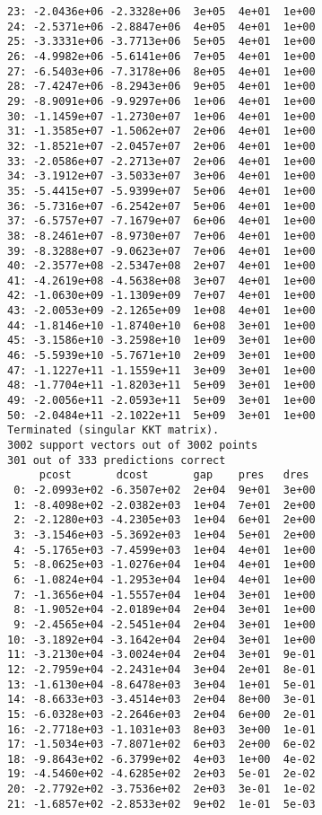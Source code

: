 \documentclass[11pt]{article}
\begin{document}
\begin{Verbatim}[commandchars=\\\{\}]
23: -2.0436e+06 -2.3328e+06  3e+05  4e+01  1e+00
24: -2.5371e+06 -2.8847e+06  4e+05  4e+01  1e+00
25: -3.3331e+06 -3.7713e+06  5e+05  4e+01  1e+00
26: -4.9982e+06 -5.6141e+06  7e+05  4e+01  1e+00
27: -6.5403e+06 -7.3178e+06  8e+05  4e+01  1e+00
28: -7.4247e+06 -8.2943e+06  9e+05  4e+01  1e+00
29: -8.9091e+06 -9.9297e+06  1e+06  4e+01  1e+00
30: -1.1459e+07 -1.2730e+07  1e+06  4e+01  1e+00
31: -1.3585e+07 -1.5062e+07  2e+06  4e+01  1e+00
32: -1.8521e+07 -2.0457e+07  2e+06  4e+01  1e+00
33: -2.0586e+07 -2.2713e+07  2e+06  4e+01  1e+00
34: -3.1912e+07 -3.5033e+07  3e+06  4e+01  1e+00
35: -5.4415e+07 -5.9399e+07  5e+06  4e+01  1e+00
36: -5.7316e+07 -6.2542e+07  5e+06  4e+01  1e+00
37: -6.5757e+07 -7.1679e+07  6e+06  4e+01  1e+00
38: -8.2461e+07 -8.9730e+07  7e+06  4e+01  1e+00
39: -8.3288e+07 -9.0623e+07  7e+06  4e+01  1e+00
40: -2.3577e+08 -2.5347e+08  2e+07  4e+01  1e+00
41: -4.2619e+08 -4.5638e+08  3e+07  4e+01  1e+00
42: -1.0630e+09 -1.1309e+09  7e+07  4e+01  1e+00
43: -2.0053e+09 -2.1265e+09  1e+08  4e+01  1e+00
44: -1.8146e+10 -1.8740e+10  6e+08  3e+01  1e+00
45: -3.1586e+10 -3.2598e+10  1e+09  3e+01  1e+00
46: -5.5939e+10 -5.7671e+10  2e+09  3e+01  1e+00
47: -1.1227e+11 -1.1559e+11  3e+09  3e+01  1e+00
48: -1.7704e+11 -1.8203e+11  5e+09  3e+01  1e+00
49: -2.0056e+11 -2.0593e+11  5e+09  3e+01  1e+00
50: -2.0484e+11 -2.1022e+11  5e+09  3e+01  1e+00
Terminated (singular KKT matrix).
3002 support vectors out of 3002 points
301 out of 333 predictions correct
     pcost       dcost       gap    pres   dres
 0: -2.0993e+02 -6.3507e+02  2e+04  9e+01  3e+00
 1: -8.4098e+02 -2.0382e+03  1e+04  7e+01  2e+00
 2: -2.1280e+03 -4.2305e+03  1e+04  6e+01  2e+00
 3: -3.1546e+03 -5.3692e+03  1e+04  5e+01  2e+00
 4: -5.1765e+03 -7.4599e+03  1e+04  4e+01  1e+00
 5: -8.0625e+03 -1.0276e+04  1e+04  4e+01  1e+00
 6: -1.0824e+04 -1.2953e+04  1e+04  4e+01  1e+00
 7: -1.3656e+04 -1.5557e+04  1e+04  3e+01  1e+00
 8: -1.9052e+04 -2.0189e+04  2e+04  3e+01  1e+00
 9: -2.4565e+04 -2.5451e+04  2e+04  3e+01  1e+00
10: -3.1892e+04 -3.1642e+04  2e+04  3e+01  1e+00
11: -3.2130e+04 -3.0024e+04  2e+04  3e+01  9e-01
12: -2.7959e+04 -2.2431e+04  3e+04  2e+01  8e-01
13: -1.6130e+04 -8.6478e+03  3e+04  1e+01  5e-01
14: -8.6633e+03 -3.4514e+03  2e+04  8e+00  3e-01
15: -6.0328e+03 -2.2646e+03  2e+04  6e+00  2e-01
16: -2.7718e+03 -1.1031e+03  8e+03  3e+00  1e-01
17: -1.5034e+03 -7.8071e+02  6e+03  2e+00  6e-02
18: -9.8643e+02 -6.3799e+02  4e+03  1e+00  4e-02
19: -4.5460e+02 -4.6285e+02  2e+03  5e-01  2e-02
20: -2.7792e+02 -3.7536e+02  2e+03  3e-01  1e-02
21: -1.6857e+02 -2.8533e+02  9e+02  1e-01  5e-03

\end{Verbatim}
\end{document}
